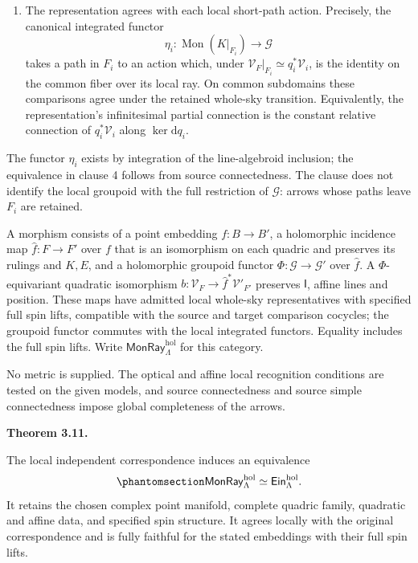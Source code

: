 \documentclass[
  english,
  11pt,
  reqno]{amsart}
\makeatletter
\newcommand{\pandocstatementheading}[1]{%
  \par\addpenalty{\@beginparpenalty}%
  \addvspace{.5\baselineskip plus .2\baselineskip minus .2\baselineskip}%
  {\normalfont\bfseries #1\par}%
  \nobreak\@afterindenttrue\@afterheading
}
\makeatother
\begin{document}
\begin{enumerate}
  cover its identity and are compatible with the supplied
  identifications of incidence, distributions, quadratic-affine data and
  position. They obey identity, inverse and triple laws, including their
  actual full spin lifts. Restriction and common refinement identify
  presentations.
\item
  The representation agrees with each local short-path action.
  Precisely, the canonical integrated functor \[
  \eta_i:\operatorname{Mon}(K|_{F_i})\longrightarrow\mathcal G
  \] takes a path in \(F_i\) to an action which, under
  \(\mathcal V_F|_{F_i}\simeq q_i^*\mathcal V_i\), is the identity on
  the common fiber over its local ray. On common subdomains these
  comparisons agree under the retained whole-sky transition.
  Equivalently, the representation's infinitesimal partial connection is
  the constant relative connection of \(q_i^*\mathcal V_i\) along
  \(\ker\mathrm dq_i\).
\end{enumerate}

The functor \(\eta_i\) exists by integration of the line-algebroid
inclusion; the equivalence in clause 4 follows from source
connectedness. The clause does not identify the local groupoid with the
full restriction of \(\mathcal G\): arrows whose paths leave \(F_i\) are
retained.

A morphism consists of a point embedding \(f:B\to B'\), a holomorphic
incidence map \(\widehat f:F\to F'\) over \(f\) that is an isomorphism
on each quadric and preserves its rulings and \(K,E\), and a holomorphic
groupoid functor \(\Phi:\mathcal G\to\mathcal G'\) over \(\widehat f\).
A \(\Phi\)-equivariant quadratic isomorphism
\(b:\mathcal V_F\to\widehat f^*\mathcal V'_{F'}\) preserves
\(\mathsf I\), affine lines and position. These maps have admitted local
whole-sky representatives with specified full spin lifts, compatible
with the source and target comparison cocycles; the groupoid functor
commutes with the local integrated functors. Equality includes the full
spin lifts. Write \(\mathsf{MonRay}^{\mathrm{hol}}_\Lambda\) for this
category.

No metric is supplied. The optical and affine local recognition
conditions are tested on the given models, and source connectedness and
source simple connectedness impose global completeness of the arrows.

\pandocstatementheading{\protect{}\label{thm:independent-monodromy-equivalence}Theorem 3.11.}

The local independent correspondence induces an equivalence
\begin{equation}\protect\phantomsection\label{eq:independent-monodromy-equivalence}{
\mathsf{MonRay}^{\mathrm{hol}}_\Lambda
\simeq\mathsf{Ein}^{\mathrm{hol}}_\Lambda.
}\end{equation} It retains the chosen complex point manifold, complete
quadric family, quadratic and affine data, and specified spin structure.
It agrees locally with the original correspondence and is fully faithful
for the stated embeddings with their full spin lifts.
\end{document}
